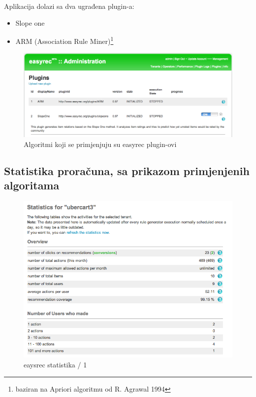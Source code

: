 \documentclass[times, utf8, seminar]{fit}
\begin{document}
{{Aplikacija dolazi sa dva ugrađena plugin-a:
\begin{itemize}
  \item Slope one
  \item ARM (Association Rule Miner)\footnote{baziran na Apriori algoritmu od R. Agrawal 1994}
\end{itemize}

\begin{figure}[H]
\centering
\includegraphics[width=12cm]{img/easyrec_10_plugins.png}
\caption{Algoritmi koji se primjenjuju su easyrec plugin-ovi}
\end{figure}

\subsection{Statistika proračuna, sa prikazom primjenjenih algoritama}

\begin{figure}[H]
\centering
\includegraphics[width=12cm]{img/easyrec_statistika_1.png}
\caption{eaysrec statistika / 1}
\end{figure}

}}
\end{document}
